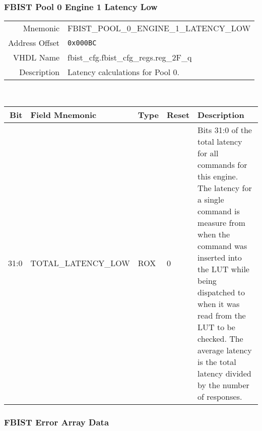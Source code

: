 \subsubsection{FBIST Pool 0 Engine 1 Latency Low}
\begin{tabular}{ r | p{350px} }
  Mnemonic       & FBIST\_POOL\_0\_ENGINE\_1\_LATENCY\_LOW \\
  Address Offset & \texttt{0x000BC}                        \\
  VHDL Name      &  fbist\_cfg.fbist\_cfg\_regs.reg\_2F\_q \\ \hline

  Description &
  Latency calculations for Pool 0. \\
\end{tabular}
\\
\begin{tabularx}{\textwidth}{r|l|l|l|X}
  \hline
  Bit   & Field Mnemonic      & Type & Reset & Description \\ \hline

  31:0  & TOTAL\_LATENCY\_LOW & ROX  & 0     &

  Bits 31:0 of the total latency for all commands for this engine. The
  latency for a single command is measure from when the command was
  inserted into the LUT while being dispatched to when it was read
  from the LUT to be checked. The average latency is the total latency
  divided by the number of responses. \\
\end{tabularx}

\subsubsection{FBIST Error Array Data  }


